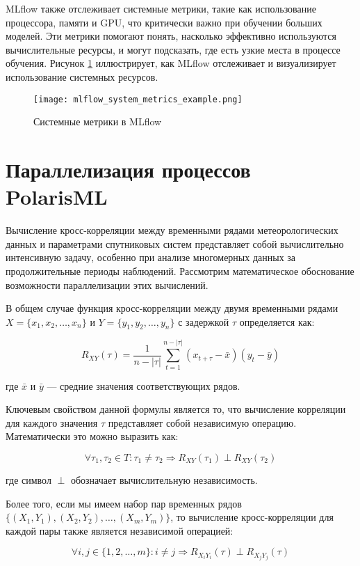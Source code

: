 MLflow также отслеживает системные метрики, такие как использование процессора, памяти и GPU, что критически важно при обучении больших моделей. Эти метрики помогают понять, насколько эффективно используются вычислительные ресурсы, и могут подсказать, где есть узкие места в процессе обучения. Рисунок \ref{fig:mlflow_system_metrics} иллюстрирует, как MLflow отслеживает и визуализирует использование системных ресурсов.

\begin{figure}[H]
	\centering
	\texttt{[image: mlflow\_system\_metrics\_example.png]}
	\caption{Системные метрики в MLflow}
	\label{fig:mlflow_system_metrics}
\end{figure}

\section{Параллелизация процессов PolarisML}

Вычисление кросс-корреляции между временными рядами метеорологических данных и
параметрами спутниковых систем представляет собой вычислительно интенсивную
задачу, особенно при анализе многомерных данных за продолжительные периоды
наблюдений. Рассмотрим математическое обоснование возможности параллелизации
этих вычислений.

В общем случае функция кросс-корреляции между двумя временными рядами $X =
	\{x_1, x_2, \ldots, x_n\}$ и $Y = \{y_1, y_2, \ldots, y_n\}$ с задержкой $\tau$
определяется как:

\[
	R_{XY}(\tau) = \frac{1}{n-|\tau|} \sum_{t=1}^{n-|\tau|} (x_{t+\tau} - \bar{x})(y_t - \bar{y})
\]

где $\bar{x}$ и $\bar{y}$ — средние значения соответствующих рядов.

Ключевым свойством данной формулы является то, что вычисление корреляции для
каждого значения $\tau$ представляет собой независимую операцию. Математически
это можно выразить как:

\[
	\forall \tau_1, \tau_2 \in T: \tau_1 \neq \tau_2 \Rightarrow R_{XY}(\tau_1) \perp R_{XY}(\tau_2)
\]

где символ $\perp$ обозначает вычислительную независимость.

Более того, если мы имеем набор пар временных рядов $\{(X_1, Y_1), (X_2, Y_2),
	\ldots, (X_m, Y_m)\}$, то вычисление кросс-корреляции для каждой пары также
является независимой операцией:

\[
	\forall i, j \in \{1, 2, \ldots, m\}: i \neq j \Rightarrow R_{X_i Y_i}(\tau) \perp R_{X_j Y_j}(\tau)
\]


